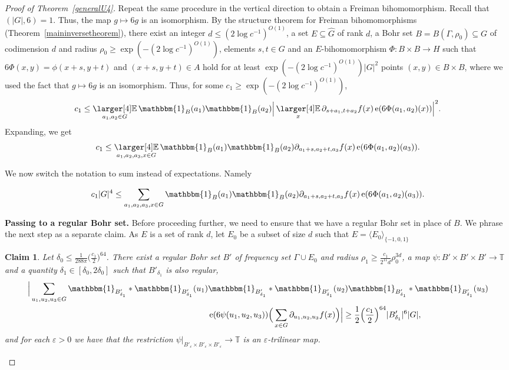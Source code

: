 \documentclass[a4paper,11pt]{article}
\numberwithin{theorem}{section}
\newtheorem{claim}[theorem]{Claim}
\theoremstyle{definition}
\newcommand\id{\mathbbm{1}}
\newcommand{\on}[1]{
	\operatorname{#1}
}
\newcommand{\exx}{
  \mathop{
    \mathchoice{\vcenter{\hbox{\larger[4]$\mathbb{E}$}}}
               {\kern0pt\mathbb{E}}
               {\kern0pt\mathbb{E}}
               {\kern0pt\mathbb{E}}
  }\displaylimits
}
\begin{document}
\begin{proof}[Proof of Theorem~\ref{generalU4}]
    Repeat the same procedure in the vertical direction to obtain a Freiman bihomomorphism. Recall that $(|G|, 6) = 1$. Thus, the map $g \mapsto 6g$ is an isomorphism. By the structure theorem for Freiman bihomomorphisms (Theorem~\ref{maininversetheorem}), there exist an integer $d \leq (2\log c^{-1})^{O(1)}$, a set $E \subseteq \hat{G}$ of rank $d$, a Bohr set $B = B(\Gamma, \rho_0) \subseteq G$ of codimension $d$ and radius $\rho_0 \geq \exp(-(2\log c^{-1})^{O(1)})$, elements $s, t \in G$ and an $E$-bihomomorphism $\Phi : B \times B \to H$ such that $6\Phi(x,y) = \phi(x + s,y + t)$ and $(x + s,y + t) \in A$ hold for at least $\exp(-(2\log c^{-1})^{O(1)})|G|^2$ points $(x,y) \in B  \times B$, where we used the fact that $g \mapsto 6g$ is an isomorphism. Thus, for some $c_1 \geq \exp(-(2\log c^{-1})^{O(1)})$,
    \[c_1 \leq \exx_{a_1, a_2 \in G} \id_B(a_1)\id_B(a_2) \Big| \exx_x \partial_{s + a_1, t + a_2} f(x) \on{e}(6\Phi(a_1, a_2)(x)) \Big|^2.\]
    Expanding, we get
    \[c_1 \leq \exx_{a_1, a_2, a_3, x\in G} \id_B(a_1)\id_B(a_2) \partial_{a_1 + s, a_2 + t, a_3} f(x) \on{e}(6\Phi(a_1, a_2)(a_3)).\]

    We now switch the notation to sum instead of expectations. Namely
    
    \begin{equation}c_1 |G|^4 \leq \sum_{a_1, a_2, a_3, x\in G} \id_B(a_1)\id_B(a_2) \partial_{a_1 + s, a_2 + t, a_3} f(x) \on{e}(6\Phi(a_1, a_2)(a_3)).\label{u4genIneq1}\end{equation}

    \noindent\textbf{Passing to a regular Bohr set.} Before proceeding further, we need to ensure that we have a regular Bohr set in place of $B$. We phrase the next step as a separate claim. As $E$ is a set of rank $d$, let $E_0$ be a subset of size $d$ such that $E = \langle E_0 \rangle_{\{-1,0,1\}}$
    
    \begin{claim}\label{regularbohrpassu4inverse}
        Let $\delta_0 \leq \frac{1}{288\pi}\Big(\frac{c_1}{2}\Big)^{64}$. There exist a regular Bohr set $B'$ of frequency set $\Gamma \cup E_0$ and radius $\rho_1 \geq \frac{c_1}{2^{11}d}\rho_0^{3d}$, a map $\psi : B' \times B' \times B' \to \mathbb{T}$ and a quantity $\delta_1 \in [\delta_0, 2\delta_0]$ such that $B'_{\delta_1}$ is also regular,
        \begin{align}\Big|\sum_{u_1, u_2, u_3 \in G} \id_{B'_{\delta_1}} \ast \id_{B'_{\delta_1}}(u_1)&\id_{B'_{\delta_1}} \ast \id_{B'_{\delta_1}}(u_2)\id_{B'_{\delta_1}} \ast \id_{B'_{\delta_1}}(u_3)\nonumber\\
        &\on{e}(6\psi(u_1, u_2, u_3)) \Big(\sum_{x \in G} \partial_{u_1, u_2, u_3} f(x)\Big)\Big| \geq \frac{1}{2}\Big(\frac{c_1}{2}\Big)^{64}  |B'_{\delta_1}|^6|G|,\label{symmetriccorelationU4inverse}\end{align}
        and for each $\varepsilon > 0$ we have that the restriction $\psi|_{B'_{\varepsilon} \times B'_\varepsilon \times B'_\varepsilon} \to \mathbb{T}$ is an $\varepsilon$-trilinear map.
    \end{claim}
    

\end{proof}
\end{document}
